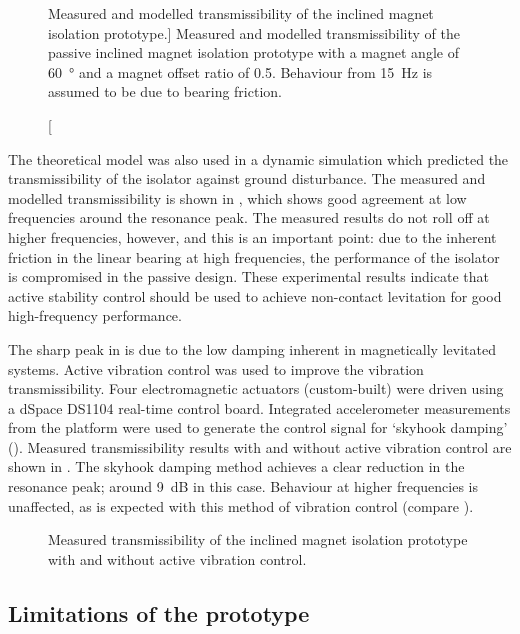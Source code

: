 \documentclass[11pt,a4paper]{memoir}
\begin{document}
\begin{figure}
\caption
[Measured and modelled transmissibility of the inclined magnet isolation prototype.]
{Measured and modelled transmissibility of the passive inclined magnet isolation prototype with a magnet angle of \SI{60}{\degree} and a magnet offset ratio of \num{0.5}. Behaviour from \SI{15}{Hz} is assumed to be due to bearing friction.}
\end{figure}

The theoretical model was also used in a dynamic simulation which predicted the transmissibility of the isolator against ground disturbance.
The measured and modelled transmissibility is shown in , which shows good agreement at low frequencies around the resonance peak.
The measured results do not roll off at higher frequencies, however, and this is an important point: due to the inherent friction in the linear bearing at high frequencies, the performance of the isolator is compromised in the passive design.
These experimental results indicate that active stability control should be used to achieve non-contact levitation for good high-frequency performance.

The sharp peak in  is due to the low damping inherent in magnetically levitated systems.
Active vibration control was used to improve the vibration transmissibility.
Four electromagnetic actuators (custom-built) were driven using a dSpace \textsc{DS}1104 real-time control board.
Integrated accelerometer measurements from the platform were used to generate the control signal for `skyhook damping' ().
Measured transmissibility results with and without active vibration control are shown in .
The skyhook damping method achieves a clear reduction in the resonance peak; around \SI{9}{dB} in this case.
Behaviour at higher frequencies is unaffected, as is expected with this method of vibration control (compare ).

\begin{figure}
\caption{Measured transmissibility of the inclined magnet isolation prototype with and without active vibration control.}
\end{figure}

\subsection{Limitations of the prototype}
\end{document}

